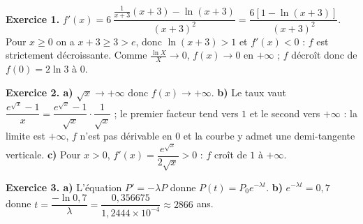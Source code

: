 \begin{corrige}
\textbf{Exercice 1.} $f'(x) = 6\,\dfrac{\frac{1}{x+3}(x+3)-\ln(x+3)}{(x+3)^{2}}
= \dfrac{6\left[1-\ln(x+3)\right]}{(x+3)^{2}}$. Pour $x \geq 0$ on a
$x+3 \geq 3 > e$, donc $\ln(x+3)>1$ et $f'(x)<0$ : $f$ est strictement
décroissante. Comme $\frac{\ln X}{X}\to0$, $f(x)\to0$ en $+\infty$ ; $f$
décroît donc de $f(0) = 2\ln3$ à $0$.

\textbf{Exercice 2. a)} $\sqrt x\to+\infty$ donc $f(x)\to+\infty$.
\textbf{b)} Le taux vaut $\dfrac{e^{\sqrt x}-1}{x}
= \dfrac{e^{\sqrt x}-1}{\sqrt x}\cdot\dfrac{1}{\sqrt x}$ ; le premier facteur
tend vers $1$ et le second vers $+\infty$ : la limite est $+\infty$, $f$ n'est
pas dérivable en $0$ et la courbe y admet une demi-tangente verticale.
\textbf{c)} Pour $x>0$, $f'(x) = \dfrac{e^{\sqrt x}}{2\sqrt x}>0$ : $f$ croît
de $1$ à $+\infty$.

\textbf{Exercice 3. a)} L'équation $P' = -\lambda P$ donne
$P(t) = P_{0}e^{-\lambda t}$.
\textbf{b)} $e^{-\lambda t} = 0{,}7$ donne
$t = \dfrac{-\ln 0{,}7}{\lambda} = \dfrac{0{,}356675}{1{,}2444\times10^{-4}}
\approx 2866$ ans.

\end{corrige}
